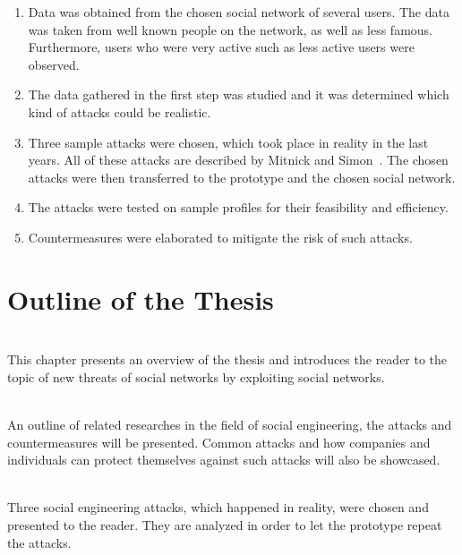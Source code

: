 \begin{enumerate}

\item Data was obtained from the chosen social network of several users. The
data was taken from well known people on the network, as well as less famous.
Furthermore, users who were very active such as less active users were
observed.

\item The data gathered in the first step was studied and it was determined
which kind of attacks could be realistic.

\item Three sample attacks were chosen, which took place in reality in the last
years. All of these attacks are described by Mitnick and
Simon~\cite{mitnick2003}. The chosen attacks were then transferred to the
prototype and the chosen social network.

\item The attacks were tested on sample profiles for their feasibility and
efficiency.

\item Countermeasures were elaborated to mitigate the risk of such attacks.

\end{enumerate}

\newpage
\section{Outline of the Thesis}

\let\oldchapterautorefname \chapterautorefname
\def\chapterautorefname{Chapter}

\vspace{0.5em}\\
\noindent This chapter presents an overview of the thesis and introduces the
reader to the topic of new threats of social networks by exploiting social
networks.

\vspace{0.5em}\\
\noindent An outline of related researches in the field of social
engineering, the attacks and countermeasures will be presented. Common attacks
and how companies and individuals can protect themselves against such attacks
will also be showcased.

\vspace{0.5em}\\
\noindent Three social engineering attacks, which happened in reality, were chosen
and presented to the reader. They are analyzed in order to let the
prototype repeat the attacks.

